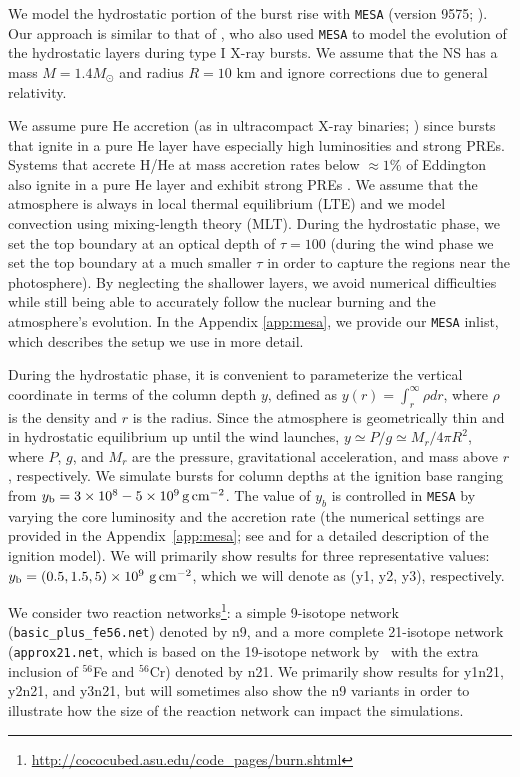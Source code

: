 \documentclass[apj,usenatbib, iop, twocolappendix]{emulateapj}
\newcommand{\trm}[1]{\textrm{#1}}
\begin{document}
We model the hydrostatic portion of the burst rise with \texttt{MESA} (version 9575; \citealt{Paxton:11, Paxton:13, Paxton:15}).  Our approach is similar to that of \citet{Paxton:11}, who also used \texttt{MESA} to model the evolution of the hydrostatic  layers during type I X-ray bursts.  We assume that the NS has a mass $M=1.4M_\odot$ and radius $R=10\trm{ km}$ and ignore corrections due to general relativity.

We assume pure He accretion (as in ultracompact X-ray binaries; \citealt{intZand:07}) since bursts that ignite in a pure He layer have especially high luminosities and strong PREs.  Systems that accrete H/He at mass accretion rates below $\approx 1\%$ of Eddington also ignite in a pure He layer and exhibit strong PREs \citep{Bildsten:98, Cumming:00, Galloway:17}. We assume that the atmosphere is always in local thermal equilibrium (LTE) and we model convection using mixing-length theory (MLT).  During the hydrostatic phase,  we set the top boundary at an optical depth of $\tau=100$ (during the wind phase we set the top boundary at a much smaller $\tau$ in order to capture the regions near the photosphere).  By neglecting the shallower layers, we avoid numerical difficulties while still being able to accurately follow the nuclear burning and the atmosphere's evolution.   In the Appendix \ref{app:mesa}, we provide our \texttt{MESA} inlist, which describes the setup we use in more detail.  

During the hydrostatic phase, it is convenient to parameterize the vertical coordinate in terms of the column depth $y$, defined as $y(r)=\int_r^{\infty}\rho dr$, where $\rho$ is the density and $r$ is the radius. Since the atmosphere is geometrically thin and in hydrostatic equilibrium up until the wind launches, $y\simeq P/g \simeq M_r/4\pi R^2$, where $P$, $g$, and $M_r$ are the pressure, gravitational acceleration, and mass above $r$, respectively. We simulate bursts for column depths at the ignition base ranging from $y_{\rm b}=3\times10^{8}-5\times10^{9}\,{\rm g\, cm^{-2}}$. The value of $y_b$ is controlled in \texttt{MESA} by varying the core luminosity and the accretion rate (the numerical settings are provided in the Appendix~\ref{app:mesa}; see \citealt{Cumming:03} and \citealt{Paxton:11} for a detailed description of the ignition model). 
We will primarily show results for three representative values: $y_{\rm b}=\left(0.5, 1.5, 5\right)\times10^{9} \ {\rm g\,cm^{-2}}$, which we will denote as (y1, y2, y3), respectively.  

We consider two reaction networks\footnote{\url{http://cococubed.asu.edu/code\_pages/burn.shtml}}: a simple 9-isotope network (\texttt{basic\_plus\_fe56.net}) denoted by n9, and a more complete 21-isotope network (\texttt{approx21.net}, which is based on the 19-isotope network by~\citealt{Weaver:78} with the extra inclusion of $^{56}$Fe and $^{56}$Cr) denoted by n21.  We primarily show results for y1n21, y2n21, and y3n21, but will sometimes also show the n9 variants in order to illustrate how the size of the reaction network can impact the simulations. 
\end{document}
